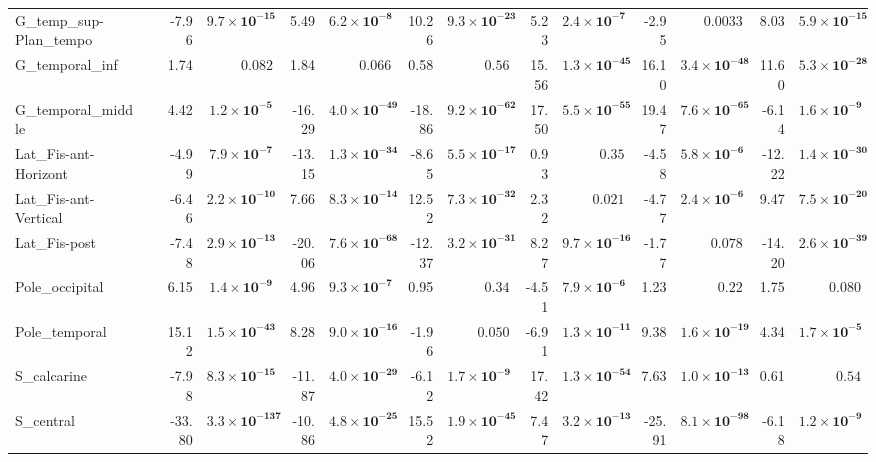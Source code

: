 {\begin{longtable}{llrrrrrrrrrrrr}
G\_temp\_sup-Plan\_tempo &  & -7.96 & $\mathbf{9.7{\times}10^{-15}}$ & 5.49 & $\mathbf{6.2{\times}10^{-8}}$ & 10.26 & $\mathbf{9.3{\times}10^{-23}}$ & 5.23 & $\mathbf{2.4{\times}10^{-7}}$ & -2.95 & $0.0033$ & 8.03 & $\mathbf{5.9{\times}10^{-15}}$ \\
G\_temporal\_inf &  & 1.74 & $0.082$ & 1.84 & $0.066$ & 0.58 & $0.56$ & 15.56 & $\mathbf{1.3{\times}10^{-45}}$ & 16.10 & $\mathbf{3.4{\times}10^{-48}}$ & 11.60 & $\mathbf{5.3{\times}10^{-28}}$ \\
G\_temporal\_middle &  & 4.42 & $\mathbf{1.2{\times}10^{-5}}$ & -16.29 & $\mathbf{4.0{\times}10^{-49}}$ & -18.86 & $\mathbf{9.2{\times}10^{-62}}$ & 17.50 & $\mathbf{5.5{\times}10^{-55}}$ & 19.47 & $\mathbf{7.6{\times}10^{-65}}$ & -6.14 & $\mathbf{1.6{\times}10^{-9}}$ \\
Lat\_Fis-ant-Horizont &  & -4.99 & $\mathbf{7.9{\times}10^{-7}}$ & -13.15 & $\mathbf{1.3{\times}10^{-34}}$ & -8.65 & $\mathbf{5.5{\times}10^{-17}}$ & 0.93 & $0.35$ & -4.58 & $\mathbf{5.8{\times}10^{-6}}$ & -12.22 & $\mathbf{1.4{\times}10^{-30}}$ \\
Lat\_Fis-ant-Vertical &  & -6.46 & $\mathbf{2.2{\times}10^{-10}}$ & 7.66 & $\mathbf{8.3{\times}10^{-14}}$ & 12.52 & $\mathbf{7.3{\times}10^{-32}}$ & 2.32 & $0.021$ & -4.77 & $\mathbf{2.4{\times}10^{-6}}$ & 9.47 & $\mathbf{7.5{\times}10^{-20}}$ \\
Lat\_Fis-post &  & -7.48 & $\mathbf{2.9{\times}10^{-13}}$ & -20.06 & $\mathbf{7.6{\times}10^{-68}}$ & -12.37 & $\mathbf{3.2{\times}10^{-31}}$ & 8.27 & $\mathbf{9.7{\times}10^{-16}}$ & -1.77 & $0.078$ & -14.20 & $\mathbf{2.6{\times}10^{-39}}$ \\
Pole\_occipital &  & 6.15 & $\mathbf{1.4{\times}10^{-9}}$ & 4.96 & $\mathbf{9.3{\times}10^{-7}}$ & 0.95 & $0.34$ & -4.51 & $\mathbf{7.9{\times}10^{-6}}$ & 1.23 & $0.22$ & 1.75 & $0.080$ \\
Pole\_temporal &  & 15.12 & $\mathbf{1.5{\times}10^{-43}}$ & 8.28 & $\mathbf{9.0{\times}10^{-16}}$ & -1.96 & $0.050$ & -6.91 & $\mathbf{1.3{\times}10^{-11}}$ & 9.38 & $\mathbf{1.6{\times}10^{-19}}$ & 4.34 & $\mathbf{1.7{\times}10^{-5}}$ \\
S\_calcarine &  & -7.98 & $\mathbf{8.3{\times}10^{-15}}$ & -11.87 & $\mathbf{4.0{\times}10^{-29}}$ & -6.12 & $\mathbf{1.7{\times}10^{-9}}$ & 17.42 & $\mathbf{1.3{\times}10^{-54}}$ & 7.63 & $\mathbf{1.0{\times}10^{-13}}$ & 0.61 & $0.54$ \\
S\_central &  & -33.80 & $\mathbf{3.3{\times}10^{-137}}$ & -10.86 & $\mathbf{4.8{\times}10^{-25}}$ & 15.52 & $\mathbf{1.9{\times}10^{-45}}$ & 7.47 & $\mathbf{3.2{\times}10^{-13}}$ & -25.91 & $\mathbf{8.1{\times}10^{-98}}$ & -6.18 & $\mathbf{1.2{\times}10^{-9}}$ \\

\end{longtable}}
